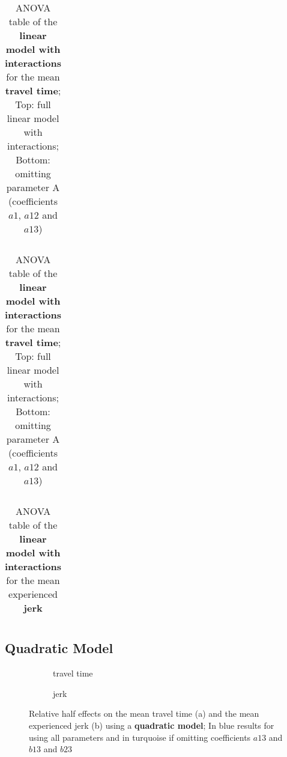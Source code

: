 \begin{table}[h!]
	\centering

	\begin{tabular}{l r r r r r}
	
	\end{tabular}

	\bigskip

	\begin{tabular}{l r r r r r}
		
	\end{tabular}

	\caption{ANOVA table of the \textbf{linear model with interactions} for the mean \textbf{travel time}; Top: full linear model with interactions; Bottom: omitting parameter A (coefficients $a1$, $a12$ and $a13$)}\label{tbl:anova_lin_interactions_time}
\end{table}

\begin{table}[h!]
	\centering

	\begin{tabular}{l r r r r r}
	
	\end{tabular}



	\caption{ANOVA table of the \textbf{linear model with interactions} for the mean experienced \textbf{jerk}}\label{tbl:anova_lin_interactions_jerk}
\end{table}



\subsection{Quadratic Model}

\begin{figure}[h]
    \centering
    \begin{subfigure}[b]{0.5\textwidth}
	    \setlength{\abovecaptionskip}{1pt plus 3pt minus 0pt}
	    
	    \caption{travel time}
	\end{subfigure}
    \begin{subfigure}[b]{0.5\textwidth}
		\setlength{\abovecaptionskip}{1pt plus 3pt minus 0pt}	
	    
   	    \caption{jerk}
	\end{subfigure}
	
    \caption{Relative half effects on the mean travel time (a) and the mean experienced jerk (b) using a \textbf{quadratic model}; In blue results for using all parameters and in turquoise if omitting coefficients $a13$ and $b13$ and $b23$}\label{fig:effects_quadr}
\end{figure} 


